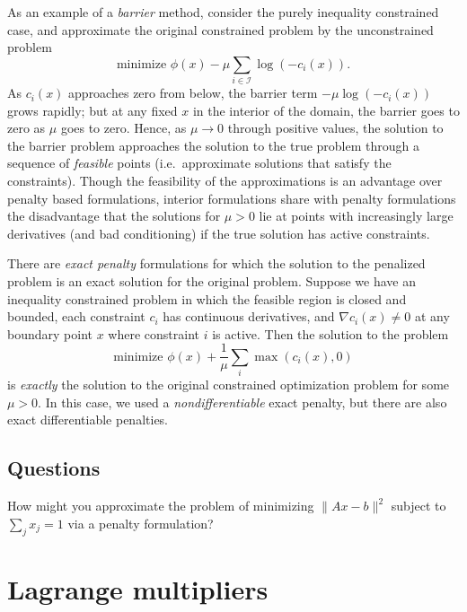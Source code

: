 \documentclass[12pt, leqno]{article} %
\begin{document}
As an example of a \emph{barrier} method, consider the purely inequality
constrained case, and approximate the original constrained problem by
the unconstrained problem
\[\mbox{minimize } \phi(x) - \mu \sum_{i \in \mathcal{I}} \log(-c_i(x)).\]
As \(c_i(x)\) approaches zero from below, the barrier term
\(-\mu \log (-c_i(x))\) grows rapidly; but at any fixed \(x\) in the
interior of the domain, the barrier goes to zero as \(\mu\) goes to
zero. Hence, as \(\mu \rightarrow 0\) through positive values, the
solution to the barrier problem approaches the solution to the true
problem through a sequence of \emph{feasible} points (i.e.~approximate
solutions that satisfy the constraints). Though the feasibility of the
approximations is an advantage over penalty based formulations, interior
formulations share with penalty formulations the disadvantage that the
solutions for \(\mu > 0\) lie at points with increasingly large
derivatives (and bad conditioning) if the true solution has active
constraints.

There are \emph{exact penalty} formulations for which the solution to
the penalized problem is an exact solution for the original problem.
Suppose we have an inequality constrained problem in which the feasible
region is closed and bounded, each constraint \(c_i\) has continuous
derivatives, and \(\nabla c_i(x) \neq 0\) at any boundary point \(x\)
where constraint \(i\) is active. Then the solution to the problem
\[\mbox{minimize } \phi(x) + \frac{1}{\mu} \sum_i \max(c_i(x), 0)\] is
\emph{exactly} the solution to the original constrained optimization
problem for some \(\mu > 0\). In this case, we used a
\emph{nondifferentiable} exact penalty, but there are also exact
differentiable penalties.

\subsection{Questions}

How might you approximate the problem of minimizing \(\|Ax-b\|^2\)
subject to \(\sum_j x_j = 1\) via a penalty formulation?

\section{Lagrange multipliers}
\end{document}
